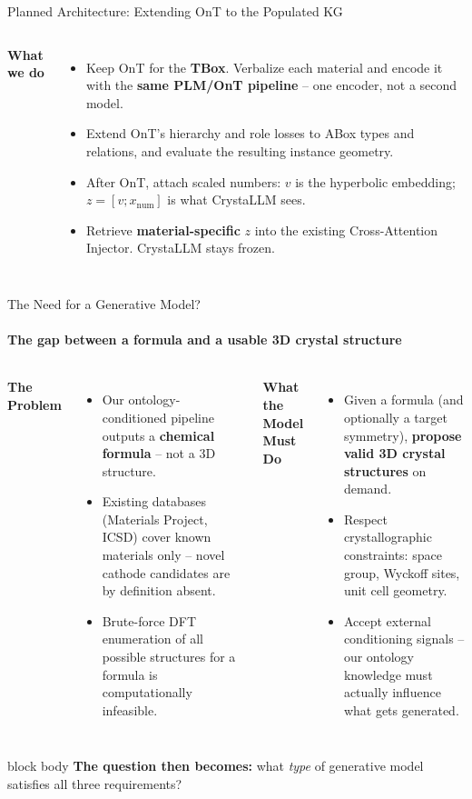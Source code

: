 \documentclass[aspectratio=169, 11pt]{beamer}
\begin{document}
\begin{frame}{Planned Architecture: Extending OnT to the Populated KG}
\begin{columns}[T]
    \footnotesize
    \textbf{What we do}
    \begin{itemize}\itemsep0.35em
        \item Keep OnT for the \textbf{TBox}. Verbalize each material and encode it with the \textbf{same PLM/OnT pipeline} -- one encoder, not a second model.
        \item Extend OnT's hierarchy and role losses to ABox types and relations, and evaluate the resulting instance geometry.
        \item After OnT, attach scaled numbers: $v$ is the hyperbolic embedding; $z=[v;x_{\mathrm{num}}]$ is what CrystaLLM sees.
        \item Retrieve \textbf{material-specific} $z$ into the existing Cross-Attention Injector. CrystaLLM stays frozen.
    \end{itemize}
\end{columns}
\end{frame}

\begin{frame}{The Need for a Generative Model?}
\framesubtitle{The gap between a formula and a usable 3D crystal structure}
\footnotesize
\begin{columns}[T]
    \textbf{The Problem}
    \begin{itemize}\itemsep0.3em
        \item Our ontology-conditioned pipeline outputs a \textbf{chemical formula} -- not a 3D structure.
        \item Existing databases (Materials Project, ICSD) cover known materials only -- novel cathode candidates are by definition absent.
        \item Brute-force DFT enumeration of all possible structures for a formula is computationally infeasible.
    \end{itemize}

    \textbf{What the Model Must Do}
    \begin{itemize}\itemsep0.3em
        \item Given a formula (and optionally a target symmetry), \textbf{propose valid 3D crystal structures} on demand.
        \item Respect crystallographic constraints: space group, Wyckoff sites, unit cell geometry.
        \item Accept external conditioning signals -- our ontology knowledge must actually influence what gets generated.
    \end{itemize}
\end{columns}

\vspace{0.3cm}
\begin{beamercolorbox}[rounded=true, sep=2.5pt]{block body}
    \centering\scriptsize
    \textbf{The question then becomes:} what \emph{type} of generative model satisfies all three requirements?
\end{beamercolorbox}
\end{frame}
\end{document}
